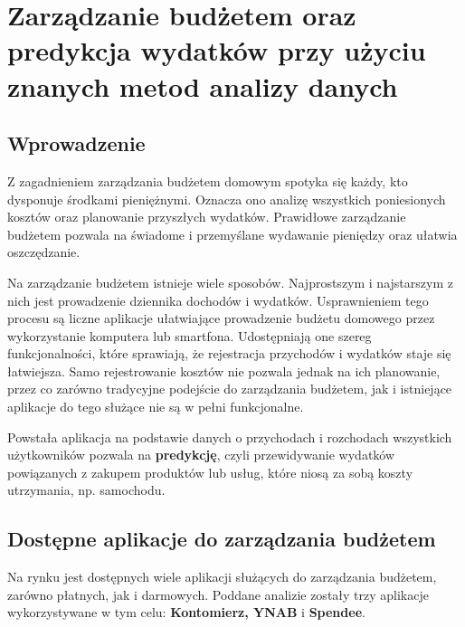 \chapter{Zarządzanie budżetem oraz predykcja wydatków przy użyciu znanych metod analizy danych}
\section{Wprowadzenie}
Z zagadnieniem zarządzania budżetem domowym spotyka się każdy, kto dysponuje środkami pieniężnymi. Oznacza ono analizę wszystkich poniesionych kosztów oraz planowanie przyszłych wydatków. Prawidłowe zarządzanie budżetem pozwala na świadome i przemyślane wydawanie pieniędzy oraz ułatwia oszczędzanie.

Na zarządzanie budżetem istnieje wiele sposobów. Najprostszym i najstarszym z nich jest prowadzenie dziennika dochodów i wydatków. Usprawnieniem tego procesu są liczne aplikacje ułatwiające prowadzenie budżetu domowego przez wykorzystanie komputera lub smartfona. Udostępniają one szereg funkcjonalności, które sprawiają, że rejestracja przychodów i wydatków staje się łatwiejsza. Samo rejestrowanie kosztów nie pozwala jednak na ich planowanie, przez co zarówno tradycyjne podejście do zarządzania budżetem, jak i istniejące aplikacje do tego służące nie są w pełni funkcjonalne.
 
Powstała aplikacja na podstawie danych o przychodach i rozchodach wszystkich użytkowników pozwala na \textbf{predykcję}, czyli przewidywanie wydatków powiązanych z zakupem produktów lub usług, które niosą za sobą koszty utrzymania, np. samochodu.
\section{Dostępne aplikacje do zarządzania budżetem}
Na rynku jest dostępnych wiele aplikacji służących do zarządzania budżetem, zarówno płatnych, jak i darmowych. Poddane analizie zostały trzy aplikacje wykorzystywane w tym celu: \textbf{Kontomierz, YNAB} i \textbf{Spendee}.

